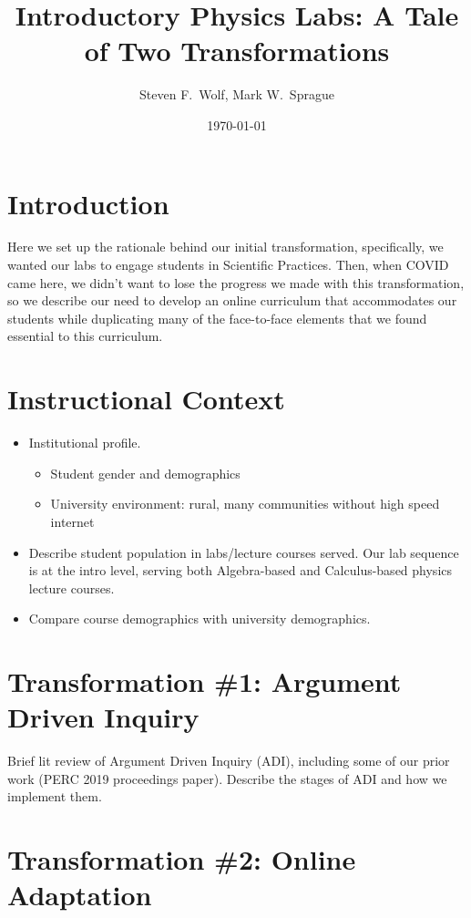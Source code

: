 \documentclass{article}
\title{Introductory Physics Labs:  A Tale of Two Transformations}
\author{Steven F.\ Wolf, Mark W.\ Sprague}
\date{\today}
\begin{document}
\maketitle

\section{Introduction}

Here we set up the rationale behind our initial transformation, specifically, we wanted our
labs to engage students in Scientific Practices.  Then, when COVID came here, we didn't want to
lose the progress we made with this transformation, so we describe our need to develop an
online curriculum that accommodates our students while duplicating many of the face-to-face
elements that we found essential to this curriculum.

\section{Instructional Context}

\begin{itemize}
  \item Institutional profile.
  \begin{itemize}
    \item Student gender and demographics
    \item University environment: rural, many communities without high speed internet
  \end{itemize}
  \item Describe student population in labs/lecture courses served.  Our lab sequence is at the
  intro level, serving both Algebra-based and Calculus-based physics lecture courses.
  \item Compare course demographics with university demographics.
\end{itemize}


\section{Transformation \#1: Argument Driven Inquiry}

Brief lit review of Argument Driven Inquiry (ADI), including some of our prior work (PERC 2019
proceedings paper).  Describe the stages of ADI and how we implement them.

\section{Transformation \#2: Online Adaptation}
\end{document}
